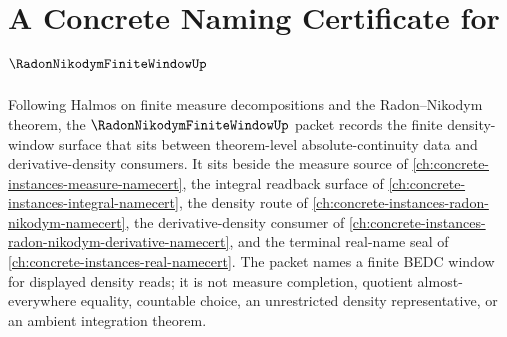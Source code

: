 \chapter{A Concrete Naming Certificate for $\RadonNikodymFiniteWindowUp$}
\label{ch:concrete-instances-radon-nikodym-finite-window-namecert}

Following Halmos on finite measure decompositions and the Radon--Nikodym theorem, the $\RadonNikodymFiniteWindowUp$ packet records the finite density-window surface that sits between theorem-level absolute-continuity data and derivative-density consumers. It sits beside the measure source of \autoref{ch:concrete-instances-measure-namecert}, the integral readback surface of \autoref{ch:concrete-instances-integral-namecert}, the density route of \autoref{ch:concrete-instances-radon-nikodym-namecert}, the derivative-density consumer of \autoref{ch:concrete-instances-radon-nikodym-derivative-namecert}, and the terminal real-name seal of \autoref{ch:concrete-instances-real-namecert}. The packet names a finite BEDC window for displayed density reads; it is not measure completion, quotient almost-everywhere equality, countable choice, an unrestricted density representative, or an ambient integration theorem.

